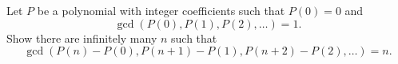 Let $P$ be a polynomial with integer coefficients such that $P(0)=0$ and \[\gcd(P(0), P(1), P(2), \ldots ) = 1.\] Show there are infinitely many $n$ such that \[\gcd(P(n)- P(0), P(n+1)-P(1), P(n+2)-P(2), \ldots) = n.\]